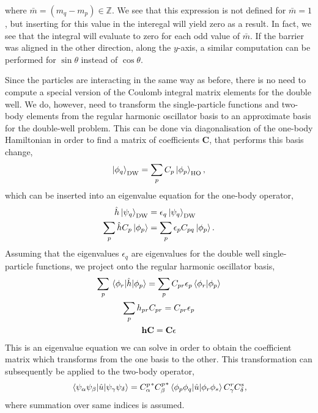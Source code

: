 where $\bar{m} = (m_q - m_p) \in \mathbb{Z}$. We see that this expression is 
not defined for $\bar{m} = 1$, but inserting for this value in the interegal 
will yield zero as a result. In fact, we see that the integral will evaluate to zero for 
each odd value of $\bar{m}$. If the barrier was aligned in the other direction,
along the $y$-axis, a similar computation can be performed for $\sin\theta$ instead of 
$\cos\theta$.

Since the particles are interacting in the same way as before, there is no need 
to compute a special version of the Coulomb integral matrix elements for the 
double well. We do, however, need to transform the single-particle functions and 
two-body elements from the regular harmonic oscillator basis to an approximate basis 
for the double-well problem. This can be done via diagonalisation of the one-body 
Hamiltonian in order to find a matrix of coefficients $\mathbf{C}$, that performs
this basis change,
\begin{equation}
    \ket{\phi_q}_\text{DW} = \sum_p C_p \ket{\phi_p}_\text{HO},
\end{equation}
which can be inserted into an eigenvalue equation for the one-body operator,
\begin{equation}
    \begin{aligned}
        \hat{h} \ket{\psi_q}_\text{DW} &= \epsilon_q\ket{\psi_q}_\text{DW} \\
        \sum_p \hat{h}C_p \ket{\phi_p} &= \sum_p\epsilon_p C_{pq}\ket{\phi_p}.
    \end{aligned}
\end{equation}
Assuming that the eigenvalues $\epsilon_q$ are eigenvalues for the double well 
single-particle functions, we project onto the regular harmonic oscillator 
basis,
\begin{equation}
    \begin{gathered}
     \sum_p\mel{\phi_r}{\hat{h}}{\phi_p} 
        = \sum_p C_{pr} \epsilon_p \braket{\phi_r}{\phi_p} \\
    \sum_p h_{pr} C_{pr} = C_{pr}\epsilon_p \\
    \mathbf{h} \mathbf{C} = \mathbf{C} \mathbf{\epsilon}
    \end{gathered}
\end{equation}
This is an eigenvalue equation we can solve in order to obtain the coefficient 
matrix which transforms from the one basis to the other. This transformation
can subsequently be applied to the two-body operator,
\begin{equation}
    \mel{\psi_\alpha\psi_\beta}{\hat{u}}{\psi_\gamma\psi_\delta} 
    = {C^p_\alpha}^* {C^p_\beta}^* \mel{\phi_p\phi_q}{\hat{u}}{\phi_r\phi_s} C^r_\gamma C^s_\delta,
\end{equation}
where summation over same indices is assumed.

